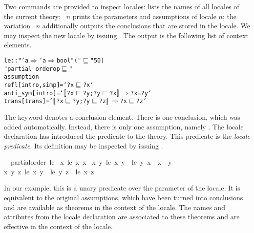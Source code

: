 \begin{isabellebody}
\begin{isamarkuptext}
  Two commands are provided to inspect locales:
   lists the names of all locales of the
  current theory; ~$n$ prints the parameters
  and assumptions of locale $n$; the variation ~$n$
  additionally outputs the conclusions that are stored in the locale.
  We may inspect the new locale
  by issuing  .  The output
  is the following list of context elements.
\begin{small}
\begin{alltt}
   le :: "'a \(\Rightarrow\) 'a \(\Rightarrow\)  bool" ( "\(\sqsubseteq\)" 50)
   "partial_order op \(\sqsubseteq\)"
   assumption
    refl [intro, simp] = `?x \(\sqsubseteq\) ?x`
    anti_sym [intro] = `\(\isasymlbrakk\)?x \(\sqsubseteq\) ?y; ?y \(\sqsubseteq\) ?x\(\isasymrbrakk\) \(\Longrightarrow\) ?x = ?y`
    trans [trans] = `\(\isasymlbrakk\)?x \(\sqsubseteq\) ?y; ?y \(\sqsubseteq\) ?z\(\isasymrbrakk\) \(\Longrightarrow\) ?x \(\sqsubseteq\) ?z`
\end{alltt}
\end{small}
  The keyword  denotes a conclusion element.  There
  is one conclusion, which was added automatically.  Instead, there is
  only one assumption, namely .  The locale
  declaration has introduced the predicate  to the theory.  This predicate is the
  \emph{locale predicate}.  Its definition may be inspected by
  issuing  .
  \begin{isabelle}%
\ \ partial{\isacharunderscore}order\ {\isacharquery}le\ {\isasymequiv}\isanewline
\isaindent{\ \ }{\isacharparenleft}{\isasymforall}x{\isachardot}\ {\isacharquery}le\ x\ x{\isacharparenright}\ {\isasymand}\isanewline
\isaindent{\ \ }{\isacharparenleft}{\isasymforall}x\ y{\isachardot}\ {\isacharquery}le\ x\ y\ {\isasymlongrightarrow}\ {\isacharquery}le\ y\ x\ {\isasymlongrightarrow}\ x\ {\isacharequal}\ y{\isacharparenright}\ {\isasymand}\isanewline
\isaindent{\ \ }{\isacharparenleft}{\isasymforall}x\ y\ z{\isachardot}\ {\isacharquery}le\ x\ y\ {\isasymlongrightarrow}\ {\isacharquery}le\ y\ z\ {\isasymlongrightarrow}\ {\isacharquery}le\ x\ z{\isacharparenright}%
\end{isabelle}
  In our example, this is a unary predicate over the parameter of the
  locale.  It is equivalent to the original assumptions, which have
  been turned into conclusions and are
  available as theorems in the context of the locale.  The names and
  attributes from the locale declaration are associated to these
  theorems and are effective in the context of the locale.


\end{isamarkuptext}
\end{isabellebody}
